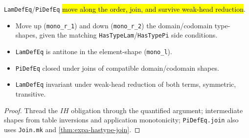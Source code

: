 \begin{lemma}
\label{family:expa-lrs-mono}
\leanok
{}
 \texttt{LamDefEq}/\texttt{PiDefEq} \hl{move along the order, join, and survive
weak-head reduction}.
\begin{itemize}
\item Move up (\texttt{mono\_r\_1}) and down (\texttt{mono\_r\_2}) the domain/codomain type-shapes,
given the matching \texttt{HasTypeLam}/\texttt{HasTypePi} side conditions.
\item \texttt{LamDefEq} is antitone in the element-shape (\texttt{mono\_l}).
\item \texttt{PiDefEq} closed under joins of compatible domain/codomain shapes.
\item \texttt{LamDefEq} invariant under weak-head reduction of both terms, symmetric, transitive.
\end{itemize}
\end{lemma}
\begin{proof}
\leanok
{} Thread the $\mathit{IH}$ obligation through the quantified argument; intermediate shapes from
table inversions and application monotonicity; \texttt{PiDefEq.join} also uses \texttt{Join.mk} and
\ref{thm:expa-hastype-join}.
\end{proof}

